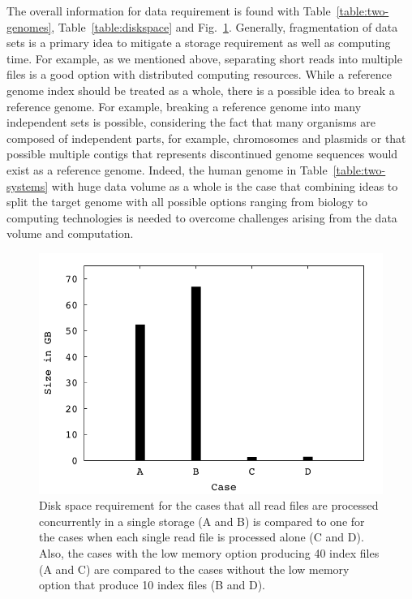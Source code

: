 \documentclass{acm_proc_article-sp}
\begin{document}
The overall information for data requirement is found with Table~\ref{table:two-genomes}, Table~\ref{table:diskspace} and Fig.~\ref{fig:diskspace}.   Generally, fragmentation of data sets is a primary idea to mitigate a storage requirement as well as computing time.  For example, as we mentioned above, separating short reads into multiple files is a good option with distributed computing resources.  While a reference genome index should be treated as a whole, there is a possible idea to break a reference genome.  For example, breaking a reference genome into many independent sets is possible, considering the fact that many organisms are composed of independent parts, for example, chromosomes and plasmids or that possible multiple contigs that represents discontinued genome sequences would exist as a reference genome.  Indeed, the human genome in Table~\ref{table:two-systems} with huge data volume as a whole is the case that combining ideas to split the target genome with all possible options ranging from biology to computing technologies is needed to overcome challenges arising from the data volume and computation.   


\begin{figure}
 \centering
\includegraphics[scale=0.66]{figures/diskspace.pdf}
\caption{\small Disk space requirement for the cases that all read
  files are processed concurrently in a single storage (A and B) is
  compared to one for the cases when each single read file is
  processed alone (C and D).  Also, the cases with the low memory
  option producing 40 index files (A and C) are compared to the cases
  without the low memory option that produce 10 index files (B and
  D). }
  \label{fig:diskspace} 
 \end{figure}
\end{document}
